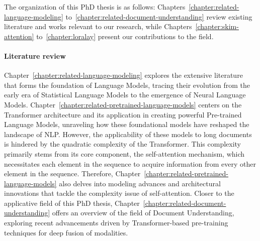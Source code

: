 
The organization of this PhD thesis is as follows: Chapters~\ref{chapter:related-language-modeling} to~\ref{chapter:related-document-understanding} review existing literature and works relevant to our research, while Chapters~\ref{chapter:skim-attention} to~\ref{chapter:loralay} present our contributions to the field.

\paragraph{Literature review} Chapter~\ref{chapter:related-language-modeling} explores the extensive literature that forms the foundation of Language Models, tracing their evolution from the early era of Statistical Language Models to the emergence of Neural Language Models. Chapter~\ref{chapter:related-pretrained-language-models} centers on the Transformer architecture \citep{vaswani2017attention} and its application in creating powerful Pre-trained Language Models, unraveling how these foundational models have reshaped the landscape of \ac{NLP}. However, the applicability of these models to long documents is hindered by the quadratic complexity of the Transformer. This complexity primarily stems from its core component, the self-attention mechanism, which necessitates each element in the sequence to acquire information from every other element in the sequence. Therefore, Chapter~\ref{chapter:related-pretrained-language-models} also delves into modeling advances and architectural innovations that tackle the complexity issue of self-attention. Closer to the applicative field of this PhD thesis, Chapter~\ref{chapter:related-document-understanding} offers an overview of the field of Document Understanding, exploring recent advancements driven by Transformer-based pre-training techniques for deep fusion of modalities. 

